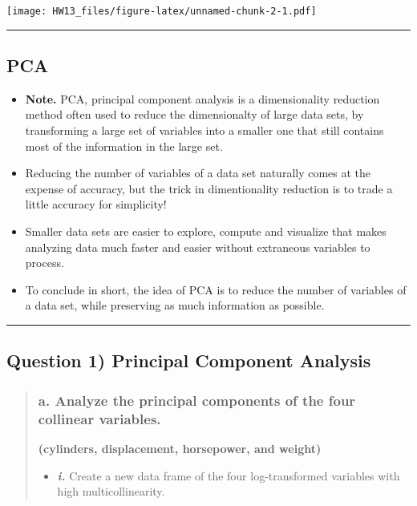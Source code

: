 \documentclass[
]{article}
\providecommand{\tightlist}{%
  \setlength{\itemsep}{0pt}\setlength{\parskip}{0pt}}
\begin{document}
\texttt{[image: HW13\_files/figure-latex/unnamed-chunk-2-1.pdf]}

\begin{center}\rule{0.5\linewidth}{0.5pt}\end{center}

\hypertarget{pca}{%
\subsection{PCA}\label{pca}}

\begin{itemize}
\item
  \textbf{Note.} PCA, principal component analysis is a dimensionality
  reduction method often used to reduce the dimensionalty of large data
  sets, by transforming a large set of variables into a smaller one that
  still contains most of the information in the large set.
\item
  Reducing the number of variables of a data set naturally comes at the
  expense of accuracy, but the trick in dimentionality reduction is to
  trade a little accuracy for simplicity!
\item
  Smaller data sets are easier to explore, compute and visualize that
  makes analyzing data much faster and easier without extraneous
  variables to process.
\item
  To conclude in short, the idea of PCA is to reduce the number of
  variables of a data set, while preserving as much information as
  possible.
\end{itemize}

\begin{center}\rule{0.5\linewidth}{0.5pt}\end{center}

\hypertarget{question-1-principal-component-analysis}{%
\subsection{Question 1) Principal Component
Analysis}\label{question-1-principal-component-analysis}}

\begin{quote}
\hypertarget{a.-analyze-the-principal-components-of-the-four-collinear-variables.}{%
\subsubsection{a. Analyze the principal components of the four collinear
variables.}\label{a.-analyze-the-principal-components-of-the-four-collinear-variables.}}

\textbf{(cylinders, displacement, horsepower, and weight)}

\begin{itemize}
\tightlist
\item
  \textbf{\emph{i.}} Create a new data frame of the four log-transformed
  variables with high multicollinearity.
\end{itemize}
\end{quote}
\end{document}
